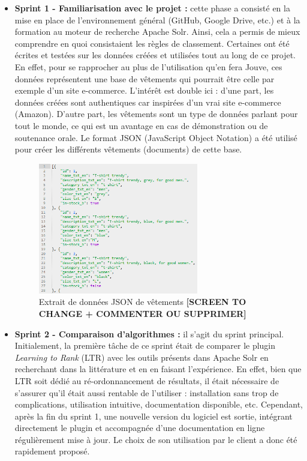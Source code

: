 \documentclass[twocolumn,a4paper]{IEEEtranfr}
\begin{document}
\begin{itemize}
  \item \textbf{Sprint 1 - Familiarisation avec le projet :} cette phase a consisté en la mise en place de l'environnement général (GitHub, Google Drive, etc.) et à la formation au moteur de recherche Apache Solr. Ainsi, cela a permis de mieux comprendre en quoi consistaient les règles de classement. Certaines ont été écrites et testées sur les données créées et utilisées tout au long de ce projet. En effet, pour se rapprocher au plus de l'utilisation qu'en fera Jouve, ces données représentent une base de vêtements qui pourrait être celle par exemple d'un site e-commerce. L'intérêt est double ici : d'une part, les données créées sont authentiques car inspirées d'un vrai site e-commerce (Amazon). D'autre part, les vêtements sont un type de données parlant pour tout le monde, ce qui est un avantage en cas de démonstration ou de soutenance orale. Le format JSON (JavaScript Object Notation) a été utilisé pour créer les différents vêtements (documents) de cette base.
  \begin{figure}[htpb]
    \begin{center}
        \includegraphics[width=7cm]{clothes.png}
    \end{center}
    \caption{Extrait de données JSON de vêtements \textbf{[SCREEN TO CHANGE + COMMENTER OU SUPPRIMER]}}
    \label{clothes}
  \end{figure}
  
  \item \textbf{Sprint 2 - Comparaison d'algorithmes :} il s'agit du sprint principal. Initialement, la première tâche de ce sprint était de comparer le plugin \textit{Learning to Rank} (LTR) avec les outils présents dans Apache Solr en recherchant dans la littérature et en en faisant l'expérience. En effet, bien que LTR soit dédié au ré-ordonnancement de résultats, il était nécessaire de s'assurer qu'il était aussi rentable de l'utiliser : installation sans trop de complications, utilisation intuitive, documentation disponible, etc. Cependant, après la fin du sprint 1, une nouvelle version du logiciel est sortie, intégrant directement le plugin et accompagnée d'une documentation en ligne régulièrement mise à jour. Le choix de son utilisation par le client a donc été rapidement proposé.
  

\end{itemize}
\end{document}
